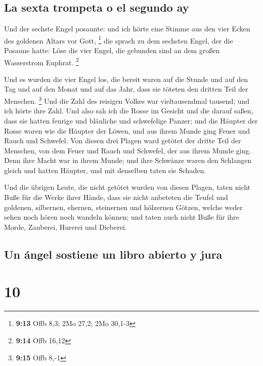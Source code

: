 \hypertarget{la-sexta-trompeta-o-el-segundo-ay}{%
\subsection{La sexta trompeta o el segundo
ay}\label{la-sexta-trompeta-o-el-segundo-ay}}

 Und der sechste Engel posaunte: und ich hörte eine
Stimme aus den vier Ecken des goldenen Altars vor Gott, \footnote{\textbf{9:13}
  Offb 8,3; 2Mo 27,2; 2Mo 30,1-3}  die sprach zu dem
sechsten Engel, der die Posaune hatte: Löse die vier Engel, die gebunden
sind an dem großen Wasserstrom Euphrat. \footnote{\textbf{9:14} Offb
  16,12}

 Und es wurden die vier Engel los, die bereit waren auf
die Stunde und auf den Tag und auf den Monat und auf das Jahr, dass sie
töteten den dritten Teil der Menschen. \footnote{\textbf{9:15} Offb 8,-1}
 Und die Zahl des reisigen Volkes war vieltausendmal
tausend; und ich hörte ihre Zahl.  Und also sah ich die
Rosse im Gesicht und die darauf saßen, dass sie hatten feurige und
bläuliche und schwefelige Panzer; und die Häupter der Rosse waren wie
die Häupter der Löwen, und aus ihrem Munde ging Feuer und Rauch und
Schwefel.  Von diesen drei Plagen ward getötet der dritte
Teil der Menschen, von dem Feuer und Rauch und Schwefel, der aus ihrem
Munde ging.  Denn ihre Macht war in ihrem Munde; und ihre
Schwänze waren den Schlangen gleich und hatten Häupter, und mit
denselben taten sie Schaden.

 Und die übrigen Leute, die nicht getötet wurden von
diesen Plagen, taten nicht Buße für die Werke ihrer Hände, dass sie
nicht anbeteten die Teufel und goldenen, silbernen, ehernen, steinernen
und hölzernen Götzen, welche weder sehen noch hören noch wandeln können;
 und taten auch nicht Buße für ihre Morde, Zauberei,
Hurerei und Dieberei.

\hypertarget{un-uxe1ngel-sostiene-un-libro-abierto-y-jura}{%
\subsection{Un ángel sostiene un libro abierto y
jura}\label{un-uxe1ngel-sostiene-un-libro-abierto-y-jura}}

\hypertarget{section-9}{%
\section{10}\label{section-9}}

